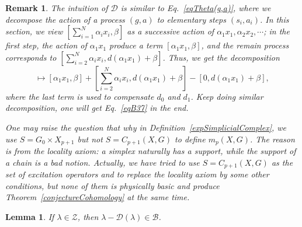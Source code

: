 \documentclass[10pt,a4paper]{amsart}
\newtheorem{lemma}{Lemma}
\newtheorem{remark}{Remark}
\begin{document}
 \begin{remark}\label{remarkDecomposition}
 	The intuition of $\mathcal{D}$ is similar to Eq.~\eqref{eqTheta(g,a)}, where we decompose the action of a process $(g,a)$ to elementary steps $(s_i,a_i)$. In this section, we view $[\sum_{i=1}^N\alpha_ix_i,\beta]$ as a successive action of $\alpha_1x_1,\alpha_2x_2,\cdots$; in the first step, the action of $\alpha_1x_1$ produce a term $[\alpha_1x_1,\beta]$, and the remain process corresponds to $[\sum_{i=2}^N\alpha_ix_i,d(\alpha_1x_1)+\beta]$. Thus, we get the decomposition
 	\begin{equation}
 		[\sum_{i=1}^N \alpha_ix_i,\beta]\mapsto [\alpha_1x_1,\beta]+[\sum_{i=2}^N\alpha_ix_i,d(\alpha_1x_1)+\beta]-[0,d(\alpha_1x_1)+\beta],
 	\end{equation}
 	where the last term is used to compensate $d_0$ and $d_1$. Keep doing similar decomposition, one will get Eq.~\eqref{eqB37} in the end.
 	
 	One may raise the question that why in Definition~\ref{expSimplicialComplex}, we use $S=G_0\times X_{p+1}$ but not $S=C_{p+1}(X,G)$ to define $m_p(X,G)$. The reason is from the locality axiom: a simplex naturally has a support, while the support of a chain is a bad notion. Actually, we have tried to use $S=C_{p+1}(X,G)$ as the set of excitation operators and to replace the locality axiom by some other conditions, but none of them is physically basic and produce Theorem~\ref{conjectureCohomology} at the same time.
 \end{remark}

\begin{lemma}
	If $\lambda\in \mathcal{Z}$, then $\lambda-\mathcal{D}(\lambda)\in\mathcal{B}$.
\end{lemma}
\end{document}
